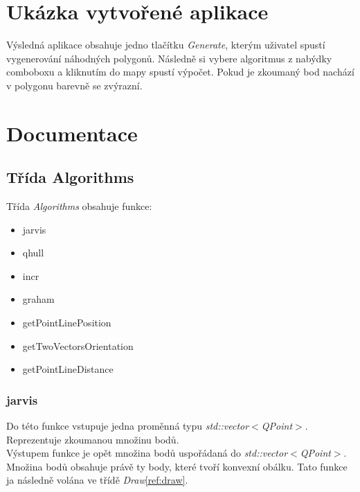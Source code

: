 \documentclass{article}
\begin{document}
\section{Ukázka vytvořené aplikace}
Výsledná aplikace obsahuje jedno tlačítku \emph{Generate}, kterým uživatel spustí vygenerování náhodných polygonů. Následně si vybere algoritmus z nabýdky comboboxu a kliknutím do mapy spustí výpočet. Pokud je zkoumaný bod nachází v polygonu barevně se zvýrazní.
%

\newpage
\section{Documentace}
\subsection{Třída Algorithms}
Třída \emph{Algorithms} obsahuje funkce:
\begin{itemize}
\item jarvis
\item qhull
\item incr
\item graham
\item getPointLinePosition
\item getTwoVectorsOrientation
\item getPointLineDistance
\end{itemize}

\subsubsection{jarvis}
\label{ref:jarvis}
Do této funkce vstupuje jedna proměnná typu  \emph{std::vector$<$QPoint$>$}. Reprezentuje zkoumanou množinu bodů.\\
Výstupem funkce je opět množina bodů uspořádaná do \emph{std::vector$<$QPoint$>$}. Množina bodů obsahuje právě ty body, které tvoří konvexní obálku. Tato funkce ja následně volána ve třídě \emph{Draw}\ref{ref:draw}.
\end{document}
